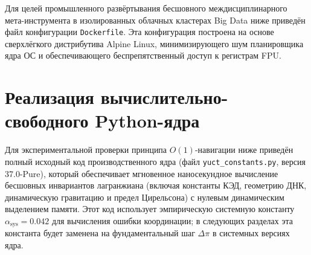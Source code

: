 \documentclass[12pt,a4paper]{article}
\begin{document}
	
	Для целей промышленного развёртывания бесшовного междисциплинарного мета-инструмента в изолированных облачных кластерах Big Data ниже приведён файл конфигурации \texttt{Dockerfile}. Эта конфигурация построена на основе сверхлёгкого дистрибутива Alpine Linux, минимизирующего шум планировщика ядра ОС и обеспечивающего беспрепятственный доступ к регистрам FPU.
	
	
	
	\section{Реализация вычислительно-свободного Python-ядра}
	Для экспериментальной проверки принципа \(O(1)\)-навигации ниже приведён полный исходный код производственного ядра (файл \texttt{yuct\_constants.py}, версия 37.0-Pure), который обеспечивает мгновенное наносекундное вычисление бесшовных инвариантов лагранжиана (включая константы КЭД, геометрию ДНК, динамическую гравитацию и предел Цирельсона) с нулевым динамическим выделением памяти. Этот код использует эмпирическую системную константу \(\alpha_{\text{sys}} = 0.042\) для вычисления ошибки координации; в следующих разделах эта константа будет заменена на фундаментальный шаг \(\Delta\pi\) в системных версиях ядра.
	
\end{document}
